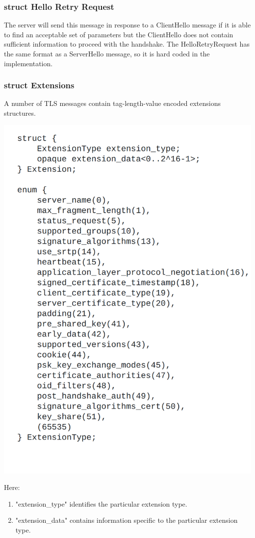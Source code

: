 \documentclass{article}
\begin{document}
\subsubsection{struct Hello Retry Request}
The server will send this message in response to a ClientHello
   message if it is able to find an acceptable set of parameters but the
   ClientHello does not contain sufficient information to proceed with
   the handshake.  The HelloRetryRequest has the same format as a ServerHello message,
   so it is hard coded in the implementation.

\subsubsection{struct Extensions}
A number of TLS messages contain tag-length-value encoded extensions
   structures.

\begin{center}
       \includegraphics[width=0.8\columnwidth]{media/Extenson.png}
\end{center}

Here:
\begin{center}
    \begin{enumerate}
        \item "extension\_type" identifies the particular extension type.
        \item "extension\_data" contains information specific to the particular
      extension type.
    \end{enumerate}
\end{center}
\end{document}
